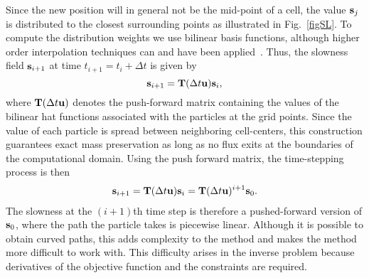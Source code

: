\documentclass[english]{siamltex}
\newcommand {\bu}   { {\bf u} }          			%
\newcommand {\bfs}   { {\bf s} }
\newcommand{\bT}  {\text{{\bf T}}} %
\begin{document}
Since the new position will in general not be the mid-point of a cell, the value $\bfs_{j}$ is 
distributed to the closest surrounding points  as illustrated in Fig.~\ref{figSL}. 
To compute the distribution weights we use bilinear basis functions, although higher order interpolation techniques can and have been applied~\cite{BridsonPIC}.
Thus, the slowness field $\bfs_{i+1}$ at time $t_{i+1} = t_{i} +\Delta t$ is given by
\begin{equation}
	\bfs_{i+1} = \bT(\Delta t\bu) \bfs_{i},
\end{equation}
where $\bT(\Delta t\bu)$ denotes the push-forward matrix containing the values of the bilinear hat functions 
 associated with the particles at the grid points. Since the value of each particle is spread 
 between neighboring cell-centers, this construction guarantees exact mass preservation as long as no flux exits at the boundaries of the computational domain.  Using the  push forward matrix, the time-stepping process is then
 \begin{eqnarray}
 \label{eq:dhcl}
 \bfs_{i+1} = \bT(\Delta t\bu) \bfs_{i} = \bT(\Delta t\bu)^{i+1} \bfs_{0}.
 \end{eqnarray}
The slowness at the $(i+1)$th time step is therefore a pushed-forward version of $\bfs_0$, where the path the particle takes is piecewise linear.
Although it is possible to obtain 
curved paths, this adds complexity to the method and makes the method more difficult to work with. This difficulty arises in the inverse problem because derivatives of  the objective function and the constraints are required.  
\end{document}
